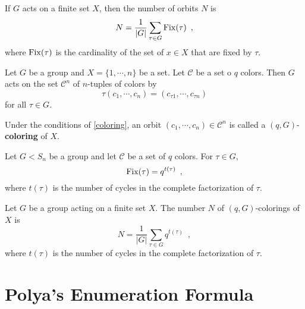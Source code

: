 \begin{lemma}[Burnside] \cite[109]{Rotman1967} If $G$ acts on a finite set $X$, then the number of orbits $N$ is
$$
N = \frac{1}{|G|} \sum_{\tau \in G} \operatorname{Fix}(\tau) \enspace,
$$
where $\operatorname{Fix}(\tau)$ is the cardinality of the set of $x \in X$ that are fixed by $\tau$.
\end{lemma}


\begin{proposition} \cite[110]{Rotman1967} \label{coloring} Let $G$ be a group and $X = \{ 1, \cdots, n \}$ be a set. Let $\mathcal{C}$ be a set o $q$ colors. Then $G$ acts on the set $\mathcal{C}^n$ of $n$-tuples of colors by
$$
\tau(c_1, \cdots, c_n) = (c_{\tau 1}, \cdots, c_{\tau n})
$$
for all $\tau \in G$.
\end{proposition}

\begin{definition} \cite[110]{Rotman1967} Under the conditions of \ref{coloring}, an orbit $(c_1, \cdots, c_n) \in \mathcal{C}^n$ is called a $(q, G)$-\textbf{coloring} of $X$.
\end{definition}

\begin{lemma} \cite[112]{Rotman1967} Let $G < S_n$ be a group and let $\mathcal{C}$ be a set of $q$ colors. For $\tau \in G$,
$$
\operatorname{Fix}(\tau) = q^{t(\tau)} \enspace,
$$
where $t(\tau)$ is the number of cycles in the complete factorization of $\tau$.
\end{lemma}

\begin{corollary} \cite[112]{Rotman1967} Let $G$ be a group acting on a finite set $X$. The number $N$ of $(q, G)$-colorings of $X$ is
$$
N = \frac{1}{|G|} \sum_{\tau \in G} q^{t(\tau)} \enspace,
$$
where $t(\tau)$ is the number of cycles in the complete factorization of $\tau$.
\end{corollary}

\section{Polya's Enumeration Formula}

